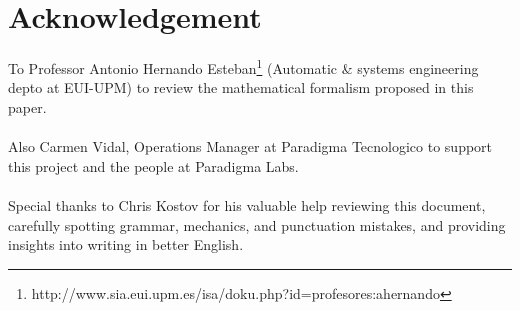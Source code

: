 \newpage

\section{Acknowledgement}

To Professor Antonio Hernando Esteban\footnote{http://www.sia.eui.upm.es/isa/doku.php?id=profesores:ahernando}  (Automatic \& systems engineering depto at EUI-UPM) to review the mathematical formalism proposed in this paper.
\\
\\
Also Carmen Vidal, Operations Manager at Paradigma Tecnologico to support this project and the people at Paradigma Labs.
\\
\\
Special thanks to Chris Kostov for his valuable help reviewing this document, carefully spotting grammar, mechanics, and punctuation mistakes, and providing insights into writing in better English.
